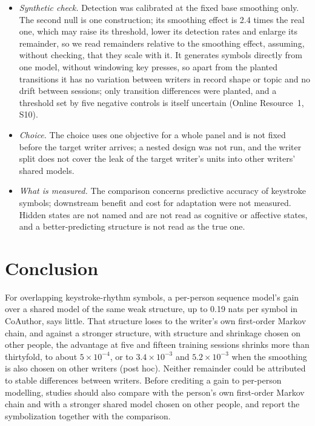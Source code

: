 \documentclass[pdflatex,sn-basic]{sn-jnl}
\newcommand{\Sref}[1]{Online Resource~1, S#1}
\begin{document}
\begin{itemize}
\item \emph{Synthetic check.} Detection was calibrated at the fixed base smoothing only. The second null is one construction; its smoothing effect is 2.4 times the real one, which may raise its threshold, lower its detection rates and enlarge its remainder, so we read remainders relative to the smoothing effect, assuming, without checking, that they scale with it. It generates symbols directly from one model, without windowing key presses, so apart from the planted transitions it has no variation between writers in record shape or topic and no drift between sessions; only transition differences were planted, and a threshold set by five negative controls is itself uncertain (\Sref{10}).
\item \emph{Choice.} The choice uses one objective for a whole panel and is not fixed before the target writer arrives; a nested design was not run, and the writer split does not cover the leak of the target writer's units into other writers' shared models.
\item \emph{What is measured.} The comparison concerns predictive accuracy of keystroke symbols; downstream benefit and cost for adaptation were not measured. Hidden states are not named and are not read as cognitive or affective states, and a better-predicting structure is not read as the true one.
\end{itemize}

\section{Conclusion}\label{sec:conclusion}

For overlapping keystroke-rhythm symbols, a per-person sequence model's gain over a shared model of the same weak structure, up to 0.19 nats per symbol in CoAuthor, says little. That structure loses to the writer's own first-order Markov chain, and against a stronger structure, with structure and shrinkage chosen on other people, the advantage at five and fifteen training sessions shrinks more than thirtyfold, to about $5\times10^{-4}$, or to $3.4\times10^{-3}$ and $5.2\times10^{-3}$ when the smoothing is also chosen on other writers (post hoc). Neither remainder could be attributed to stable differences between writers. Before crediting a gain to per-person modelling, studies should also compare with the person's own first-order Markov chain and with a stronger shared model chosen on other people, and report the symbolization together with the comparison.
\end{document}
